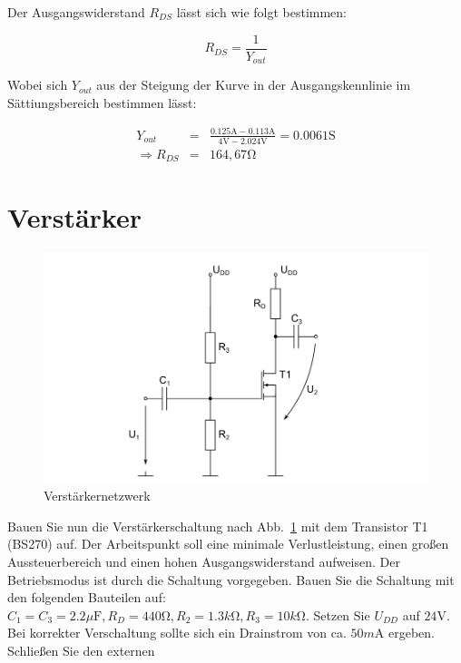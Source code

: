 \documentclass[10pt]{scrreprt}
\begin{document}
    Der Ausgangswiderstand $R_{DS}$ lässt sich wie folgt bestimmen:

    \begin{equation*}
        R_{DS} = \frac{1}{Y_{out}}
    \end{equation*}

    Wobei sich $Y_{out}$ aus der Steigung der Kurve in der Ausgangskennlinie im
    Sättiungsbereich bestimmen lässt:

    \begin{eqnarray*}
        Y_{out} &=& \frac{0.125\si{\ampere} - 0.113\si{\ampere}}{4\si{\volt} - 2.024\si{\volt}} = 0.0061\si{\siemens}\\
        \Rightarrow R_{DS} &=& 164,67 \si{\ohm}
    \end{eqnarray*}

    \section{Verstärker} \label{sec:auf43}
    \begin{figure}[H]
        \includegraphics[width=\textwidth]{abb10.png}
        \caption{Verstärkernetzwerk}
        \label{fig:abb10}
    \end{figure}
    Bauen Sie nun die Verstärkerschaltung nach Abb.~\ref{fig:abb10} mit dem Transistor T1 (BS270) auf.
    Der Arbeitspunkt soll eine minimale Verlustleistung, einen großen Aussteuerbereich und
    einen hohen Ausgangswiderstand aufweisen. Der Betriebsmodus ist durch die Schaltung
    vorgegeben. Bauen Sie die Schaltung mit den folgenden Bauteilen auf: $C_1 = C_3 = 2.2\si{\mu \farad},
    R_D = 440\si{\ohm}, R_2 = 1.3\si{k\ohm}, R_3 = 10\si{k\ohm}$. Setzen Sie $U_{DD}$ auf $24\si{\volt}$. Bei korrekter
    Verschaltung sollte sich ein Drainstrom von ca. $50\si{m \ampere}$ ergeben. Schließen Sie den externen
\end{document}
